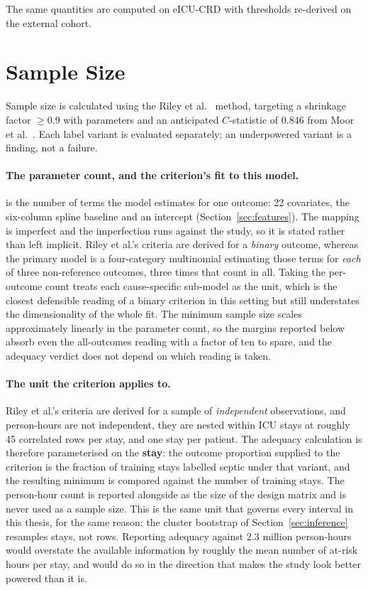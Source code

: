 The same quantities are computed on eICU-CRD with thresholds re-derived on the
external cohort.


\section{Sample Size}
\label{sec:sample_size}

Sample size is calculated using the Riley et al.\ \cite{riley2019sample}
method, targeting a shrinkage factor $\geq 0.9$ with \pcNCandidatePredictors{}
parameters and an anticipated $C$-statistic of 0.846 from Moor et al.\
\cite{moor2023review}. Each label variant is evaluated separately; an
underpowered variant is a finding, not a failure.

\paragraph{The parameter count, and the criterion's fit to this model.}
\pcNCandidatePredictors{} is the number of terms the model estimates for one
outcome: 22 covariates, the six-column spline baseline and an intercept
(Section~\ref{sec:features}). The mapping is imperfect and the imperfection runs
against the study, so it is stated rather than left implicit. Riley et al.'s
criteria are derived for a \emph{binary} outcome, whereas the primary model is a
four-category multinomial estimating those \pcNCandidatePredictors{} terms for
\emph{each} of three non-reference outcomes, three times that count in all.
Taking the
per-outcome count treats each cause-specific sub-model as the unit, which is the
closest defensible reading of a binary criterion in this setting but still
understates the dimensionality of the whole fit. The minimum sample size scales
approximately linearly in the parameter count, so the margins reported below
absorb even the all-outcomes reading with a factor of ten to spare, and the
adequacy verdict does not depend on which reading is taken.

\paragraph{The unit the criterion applies to.} Riley et al.'s criteria are
derived for a sample of \emph{independent} observations, and person-hours are
not independent, they are nested within ICU stays at roughly 45 correlated
rows per stay, and one stay per patient. The adequacy calculation is therefore
parameterised on the \textbf{stay}: the outcome proportion supplied to the
criterion is the fraction of training stays labelled septic under that variant,
and the resulting minimum is compared against the number of training stays. The
person-hour count is reported alongside as the size of the design matrix and is
never used as a sample size. This is the same unit that governs every interval
in this thesis, for the same reason: the cluster bootstrap of
Section~\ref{sec:inference} resamples stays, not rows. Reporting adequacy
against 2.3 million person-hours would overstate the available information by
roughly the mean number of at-risk hours per stay, and would do so in the
direction that makes the study look better powered than it is.


